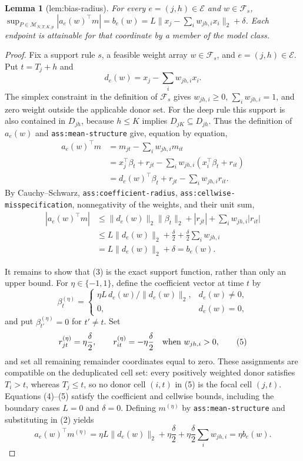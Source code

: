 \documentclass{article}
\newtheorem{lemma}{Lemma}
\begin{document}
\begin{lemma}[lem:bias-radius]\label{lem:bias-radius}
For every \(e=(j,h)\in\mathcal E\) and \(w\in\mathcal F_s\), \(\sup_{P\in\mathcal M_{N,T,K,p}}|a_e(w)^{\top}m|=b_e(w)=L\lVert x_j-\sum_iw_{jh,i}x_i\rVert_2+\delta\). Each endpoint is attainable for that coordinate by a member of the model class.
\end{lemma}
\begin{proof}
Fix a support rule \(s\), a feasible weight array \(w\in\mathcal F_s\), and
\(e=(j,h)\in\mathcal E\).  Put \(t=T_j+h\) and
\[
 d_e(w)=x_j-\sum_iw_{jh,i}x_i.
 \tag{1}
\]
The simplex constraint in the definition of \(\mathcal F_s\) gives
\(w_{jh,i}\geq0\), \(\sum_iw_{jh,i}=1\), and zero weight outside the
applicable donor set.  For the deep rule this support is also contained in
\(D_{jh}\), because \(h\leq K\) implies
\(D_{jK}\subseteq D_{jh}\).  Thus the definition of \(a_e(w)\) and
\texttt{ass:mean-structure} give, equation by equation,
\[
\begin{aligned}
 a_e(w)^{\top}m
 &=m_{jt}-\sum_iw_{jh,i}m_{it}\\
 &=x_j^{\top}\beta_t+r_{jt}
   -\sum_iw_{jh,i}(x_i^{\top}\beta_t+r_{it})\\
 &=d_e(w)^{\top}\beta_t+r_{jt}-\sum_iw_{jh,i}r_{it}.
\end{aligned}
\tag{2}
\]
By Cauchy--Schwarz, \texttt{ass:coefficient-radius},
\texttt{ass:cellwise-misspecification}, nonnegativity of the weights, and
their unit sum,
\[
\begin{aligned}
 |a_e(w)^{\top}m|
 &\leq \lVert d_e(w)\rVert_2\lVert\beta_t\rVert_2
       +|r_{jt}|+\sum_iw_{jh,i}|r_{it}|\\
 &\leq L\lVert d_e(w)\rVert_2+\frac{\delta}{2}
       +\frac{\delta}{2}\sum_iw_{jh,i}\\
 &=L\lVert d_e(w)\rVert_2+\delta
 =b_e(w).
\end{aligned}
\tag{3}
\]

It remains to show that (3) is the exact support function, rather than only
an upper bound.  For \(\eta\in\{-1,1\}\), define the coefficient vector at
time \(t\) by
\[
 \beta_t^{(\eta)}=
 \begin{cases}
 \displaystyle \eta L\,d_e(w)/\lVert d_e(w)\rVert_2,
     &d_e(w)\neq0,\\[3pt]
 0,&d_e(w)=0,
 \end{cases}
 \tag{4}
\]
and put \(\beta_{t'}^{(\eta)}=0\) for \(t'\neq t\).  Set
\[
 r_{jt}^{(\eta)}=\eta\frac{\delta}{2},
 \qquad
 r_{it}^{(\eta)}=-\eta\frac{\delta}{2}
 \quad\hbox{when }w_{jh,i}>0,
 \tag{5}
\]
and set all remaining remainder coordinates equal to zero.  These assignments
are compatible on the deduplicated cell set: every positively weighted donor
satisfies \(T_i>t\), whereas \(T_j\leq t\), so no donor cell
\((i,t)\) in (5) is the focal cell \((j,t)\).  Equations (4)--(5) satisfy
the coefficient and cellwise bounds, including the boundary cases \(L=0\)
and \(\delta=0\).  Defining \(m^{(\eta)}\) by
\texttt{ass:mean-structure} and substituting in (2) yields
\[
 a_e(w)^{\top}m^{(\eta)}
 =\eta L\lVert d_e(w)\rVert_2
   +\eta\frac{\delta}{2}
   +\eta\frac{\delta}{2}\sum_iw_{jh,i}
 =\eta b_e(w).
 \tag{6}
\]


\end{proof}
\end{document}
